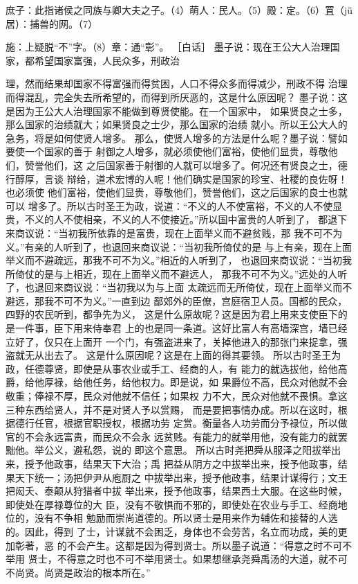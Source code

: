 \documentclass[12pt,UTF8]{ctexbook}
\begin{document}
庶子：此指诸侯之同族与卿大夫之子。（4）萌人：民人。（5）殿：定。（6）罝（jǖ居）：捕兽的网。（7） 

施：上疑脱“不”字。（8）章：通“彰”。 
［白话］ 
墨子说：现在王公大人治理国家，都希望国家富强，人民众多，刑政治 

理，然而结果却国家不得富强而得贫困，人口不得众多而得减少，刑政不得 
治理而得混乱，完全失去所希望的，而得到所厌恶的，这是什么原因呢？ 
墨子说：这是因为王公大人治理国家不能做到尊贤使能。在一个国家中， 
如果贤良之士多，那么国家的治绩就大；如果贤良之士少，那么国家的治绩 
就小。所以王公大人的急务，将是如何使贤人增多。 
那么，使贤人增多的方法是什么呢？墨子说：譬如要使一个国家的善于 
射御之人增多，就必须使他们富裕，使他们显贵，尊敬他们，赞誉他们，这 
之后国家善于射御的人就可以增多了。何况还有贤良之士，德行醇厚，言谈 
辩给，道术宏博的人呢！他们确实是国家的珍宝、社稷的良佐呀！也必须使 
他们富裕，使他们显贵，尊敬他们，赞誉他们，这之后国家的良士也就可以 
增多了。所以古时圣王为政，说道：“不义的人不使富裕，不义的人不使显 
贵，不义的人不使相亲，不义的人不使接近。”所以国中富贵的人听到了， 
都退下来商议说：“当初我所依靠的是富贵，现在上面举义而不避贫贱，那 
我不可不为义。”有亲的人听到了，也退回来商议说：“当初我所倚仗的是 
与上有亲，现在上面举义而不避疏远，那我不可不为义。”相近的人听到了， 
也退回来商议说：“当初我所倚仗的是与上相近，现在上面举义而不避远人， 
那我不可不为义。”远处的人听了，也退回来商议说：“当初我以为与上面 
太疏远而无所倚仗，现在上面举义而不避远，那我不可不为义。”一直到边 
鄙郊外的臣僚，宫庭宿卫人员。国都的民众，四野的农民听到，都争先为义， 
这是什么原故呢？这是因为君上用来支使臣下的是一件事，臣下用来侍奉君 
上的也是同一条道。这好比富人有高墙深宫，墙已经立好了，仅只在上面开 
一个门，有强盗进来了，关掉他进入的那张门来捉拿，强盗就无从出去了。 
这是什么原因呢？这是在上面的得其要领。 
所以古时圣王为政，任德尊贤，即使是从事农业或手工、经商的人，有 
能力的就选拔他，给他高爵，给他厚禄，给他任务，给他权力。即是说，如 
果爵位不高，民众对他就不会敬重；俸禄不厚，民众对他就不信任；如果权 
力不大，民众对他就不畏惧。拿这三种东西给贤人，并不是对贤人予以赏赐， 
而是要把事情办成。所以在这时，根据德行任官，根据官职授权，根据功劳 
定赏。衡量各人功劳而分予禄位，所以做官的不会永远富贵，而民众不会永 
远贫贱。有能力的就举用他，没有能力的就罢黜他。举公义，避私怨，说的 
即这个意思。 
所以古时尧把舜从服泽之阳拔举出来，授予他政事，结果天下大治；禹 
把益从阴方之中拔举出来，授予他政事，结果天下统一；汤把伊尹从庖厨之 
中拔举出来，授予他政事，结果计谋得行；文王把闳夭、泰颠从狩猎者中拔 
举出来，授予他政事，结果西土大服。在这些时候，即使处在厚禄尊位的大 
臣，没有不敬惧而不邪的，即使处在农业与手工、经商地位的，没有不争相 
勉励而崇尚道德的。所以贤士是用来作为辅佐和接替的人选的。因此，得到 
了士，计谋就不会困乏，身体也不会劳苦，名立而功成，美的更加彰著，恶 
的不会产生。这都是因为得到贤士。所以墨子说道：“得意之时不可不举用 
贤士，不得意之时也不可不举用贤士。如果想继承尧舜禹汤的大道，就不可 
不尚贤。尚贤是政治的根本所在。” 
\end{document}
